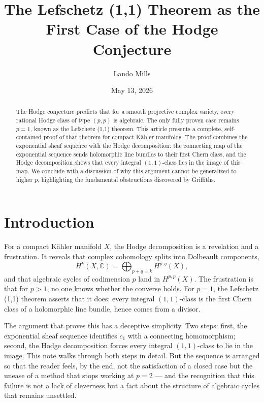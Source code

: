 \documentclass[12pt]{article}
\theoremstyle{plain}
\theoremstyle{definition}
\begin{document}
\title{The Lefschetz (1,1) Theorem as the First Case of the Hodge Conjecture}
\date{May 13, 2026}
\author{Lando Mills}
\maketitle

\begin{abstract}
The Hodge conjecture predicts that for a smooth projective complex variety, every rational Hodge class of type $(p,p)$ is algebraic. 
The only fully proven case remains $p=1$, known as the Lefschetz (1,1) theorem. 
This article presents a complete, self-contained proof of that theorem for compact K\"ahler manifolds. 
The proof combines the exponential sheaf sequence with the Hodge decomposition: the connecting map of the exponential sequence sends holomorphic line bundles to their first Chern class, and the Hodge decomposition shows that every integral $(1,1)$-class lies in the image of this map. 
We conclude with a discussion of why this argument cannot be generalized to higher $p$, highlighting the fundamental obstructions discovered by Griffiths.
\end{abstract}

\section{Introduction}

For a compact K\"ahler manifold $X$, the Hodge decomposition is a revelation and a frustration. 
It reveals that complex cohomology splits into Dolbeault components,
\[
H^k(X,\mathbb C) = \bigoplus_{p+q=k} H^{p,q}(X),
\]
and that algebraic cycles of codimension $p$ land in $H^{p,p}(X)$. 
The frustration is that for $p>1$, no one knows whether the converse holds. 
For $p=1$, the Lefschetz (1,1) theorem asserts that it does: every integral $(1,1)$-class is the first Chern class of a holomorphic line bundle, hence comes from a divisor.

The argument that proves this has a deceptive simplicity. 
Two steps: first, the exponential sheaf sequence identifies $c_1$ with a connecting homomorphism; second, the Hodge decomposition forces every integral $(1,1)$-class to lie in the image. 
This note walks through both steps in detail. 
But the sequence is arranged so that the reader feels, by the end, not the satisfaction of a closed case but the unease of a method that stops working at $p=2$ --- and the recognition that this failure is not a lack of cleverness but a fact about the structure of algebraic cycles that remains unsettled.
\end{document}
